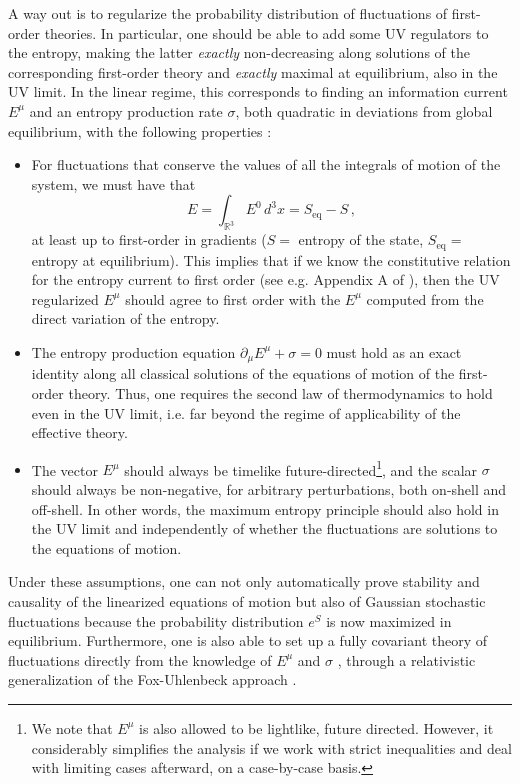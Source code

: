 \documentclass[a4paper, amsfonts, amssymb, amsmath, reprint, showkeys, nofootinbib, twoside,notitlepage,onecolumn,preprintnumbers]{revtex4-2}
\theoremstyle{definition}
\theoremstyle{theorem}
\theoremstyle{corollary}
\begin{document}
A way out is to regularize the probability distribution of fluctuations of first-order theories. In particular, one should be able to add some UV regulators to the entropy, making the latter \textit{exactly} non-decreasing along solutions of the corresponding first-order theory and \textit{exactly} maximal at equilibrium, also in the UV limit. In the linear regime, this corresponds to finding an information current $E^\mu$ and an entropy production rate $\sigma$, both quadratic in deviations from global equilibrium, with the following properties \cite{GavassinoCausality2021}:
\begin{itemize}
    \item[(i)] For fluctuations that conserve the values of all the integrals of motion of the system, we must have that \cite{GavassinoGibbs2021}
    \begin{equation}
        E=\int_{\mathbb{R}^3} E^0 \, d^3 x = S_{\text{eq}}-S \, ,
    \end{equation}
    at least up to first-order in gradients ($S=$ entropy of the state, $S_{\text{eq}}=$ entropy at equilibrium). This implies that if we know the constitutive relation for the entropy current to first order (see e.g. Appendix A of \cite{Kovtun2019}), then the UV regularized $E^\mu$ should agree to first order with the $E^\mu$ computed from the direct variation of the entropy. 
    \item[(ii)] The entropy production equation $\partial_\mu E^\mu+\sigma=0$ must hold as an exact identity along all classical solutions of the equations of motion of the first-order theory. Thus, one requires the second law of thermodynamics to hold even in the UV limit, i.e. far beyond the regime of applicability of the effective theory.   
    \item[(iii)] The vector $E^\mu$ should always be timelike future-directed\footnote{We note that $E^\mu$ is also allowed to be lightlike, future directed. However, it considerably simplifies the analysis if we work with strict inequalities and deal with limiting cases afterward, on a case-by-case basis.}, and the scalar $\sigma$ should always be non-negative, for arbitrary perturbations, both on-shell and off-shell. In other words, the maximum entropy principle should also hold in the UV limit and independently of whether the fluctuations are solutions to the equations of motion.
\end{itemize}
Under these assumptions, one can not only automatically prove stability and causality of the linearized equations of motion \cite{GavassinoGibbs2021,GavassinoCausality2021} but also of Gaussian stochastic fluctuations because the probability distribution $e^{S}$ is now maximized in equilibrium. Furthermore, one is also able to set up a fully covariant theory of fluctuations directly from the knowledge of $E^\mu$ and $\sigma$ \cite{Mullins:2023tjg}, through a relativistic generalization of the Fox-Uhlenbeck approach \cite{FoxUhlFluctuations1970}.
\end{document}
